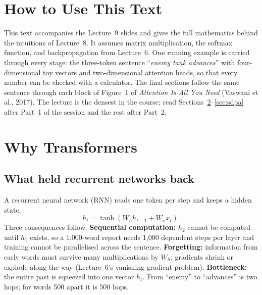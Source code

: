 \documentclass[11pt]{article}
\begin{document}
\tableofcontents
\newpage

\section{How to Use This Text}
This text accompanies the Lecture~9 slides and gives the full mathematics behind the intuitions of Lecture~8. It assumes matrix multiplication, the softmax function, and backpropagation from Lecture~6. One running example is carried through every stage: the three-token sentence ``\emph{enemy tank advances}'' with four-dimensional toy vectors and two-dimensional attention heads, so that every number can be checked with a calculator. The final sections follow the same sentence through each block of Figure~1 of \emph{Attention Is All You Need} (Vaswani et al., 2017). The lecture is the densest in the course; read Sections~\ref{sec:why}--\ref{sec:sdpa} after Part~1 of the session and the rest after Part~2.

\section{Why Transformers}\label{sec:why}
\subsection{What held recurrent networks back}
A recurrent neural network (RNN) reads one token per step and keeps a hidden state,
\[h_t=\tanh(W_hh_{t-1}+W_xx_t).\]
Three consequences follow. \textbf{Sequential computation:} $h_2$ cannot be computed until $h_1$ exists, so a 1,000-word report needs 1,000 dependent steps per layer and training cannot be parallelised across the sentence. \textbf{Forgetting:} information from early words must survive many multiplications by $W_h$; gradients shrink or explode along the way (Lecture~6's vanishing-gradient problem). \textbf{Bottleneck:} the entire past is squeezed into one vector $h_t$. From ``enemy'' to ``advances'' is two hops; for words 500 apart it is 500 hops.
\end{document}

